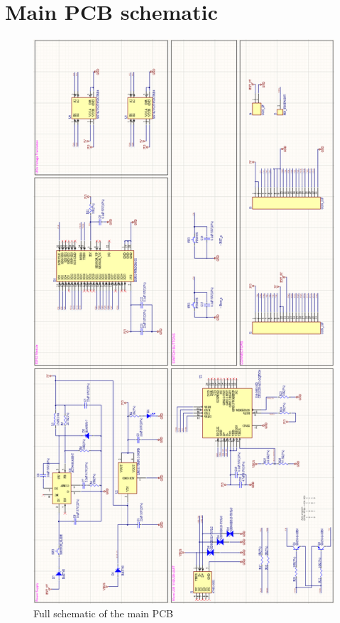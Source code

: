 \newpage
\section{Main PCB schematic}
\label{appendix:main_pcb_schematic}

\begin{figure}[H]
    \centering
    \includegraphics[height=0.9\textheight]{images/EE_fullPCBschematic.PNG}
    \caption{Full schematic of the main PCB}
    \label{fig:main_pcb_schematic}
\end{figure}
